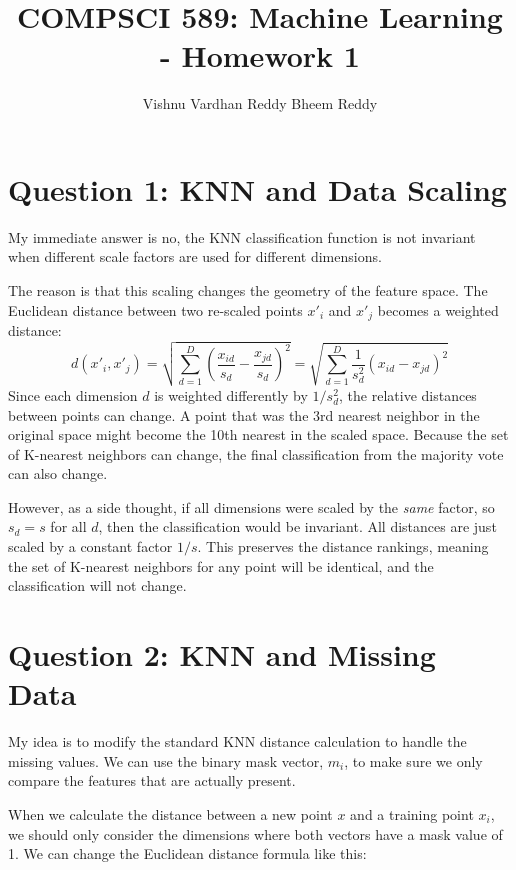 \documentclass[11pt]{article}
\title{COMPSCI 589: Machine Learning - Homework 1}
\author{Vishnu Vardhan Reddy Bheem Reddy}
\begin{document}
\maketitle

\section*{Question 1: KNN and Data Scaling}

\noindent
My immediate answer is no, the KNN classification function is not invariant when different scale factors are used for different dimensions.

\medskip
\noindent
The reason is that this scaling changes the geometry of the feature space. The Euclidean distance between two re-scaled points $x'_i$ and $x'_j$ becomes a weighted distance:
\[
d(x'_i, x'_j) = \sqrt{\sum_{d=1}^{D} \left(\frac{x_{id}}{s_d} - \frac{x_{jd}}{s_d}\right)^2} = \sqrt{\sum_{d=1}^{D} \frac{1}{s_d^2}(x_{id} - x_{jd})^2}
\]
Since each dimension $d$ is weighted differently by $1/s_d^2$, the relative distances between points can change. A point that was the 3rd nearest neighbor in the original space might become the 10th nearest in the scaled space. Because the set of K-nearest neighbors can change, the final classification from the majority vote can also change.

\medskip
\noindent
However, as a side thought, if all dimensions were scaled by the \emph{same} factor, so $s_d = s$ for all $d$, then the classification would be invariant.
All distances are just scaled by a constant factor $1/s$. This preserves the distance rankings, meaning the set of K-nearest neighbors for any point will be identical, and the classification will not change.

\section*{Question 2: KNN and Missing Data}

\noindent
My idea is to modify the standard KNN distance calculation to handle the missing values. We can use the binary mask vector, $m_i$, to make sure we only compare the features that are actually present.

\medskip
\noindent
When we calculate the distance between a new point $x$ and a training point $x_i$, we should only consider the dimensions where both vectors have a mask value of 1. We can change the Euclidean distance formula like this:
\end{document}
